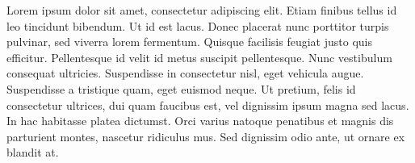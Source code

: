 Lorem ipsum dolor sit amet, consectetur adipiscing elit. Etiam finibus tellus id leo tincidunt bibendum. Ut id est lacus. Donec placerat nunc porttitor turpis pulvinar, sed viverra lorem fermentum. Quisque facilisis feugiat justo quis efficitur. Pellentesque id velit id metus suscipit pellentesque. Nunc vestibulum consequat ultricies. Suspendisse in consectetur nisl, eget vehicula augue. Suspendisse a tristique quam, eget euismod neque. Ut pretium, felis id consectetur ultrices, dui quam faucibus est, vel dignissim ipsum magna sed lacus. In hac habitasse platea dictumst. Orci varius natoque penatibus et magnis dis parturient montes, nascetur ridiculus mus. Sed dignissim odio ante, ut ornare ex blandit at.